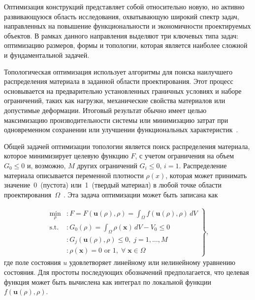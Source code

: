 Оптимизация конструкций представляет собой относительно новую, но активно развивающуюся область исследования, охватывающую широкий спектр задач, направленных на повышение функциональности и экономичности проектируемых объектов. В рамках данного направления выделяют три ключевых типа задач: оптимизацию размеров, формы и топологии, которая является наиболее сложной и фундаментальной задачей.


Топологическая оптимизация использует алгоритмы для поиска наилучшего распределения материала в заданной области проектирования. 
Этот процесс основывается на предварительно установленных граничных условиях и наборе ограничений, таких как нагрузки, механические свойства материалов или допустимые деформации. 
Итоговый результат обычно имеет целью максимизацию производительности системы или минимизацию затрат при одновременном сохранении или улучшении функциональных характеристик~\cite{Bendsoe2003}. 

Общей задачей оптимизации топологии является поиск распределения материала, которое минимизирует целевую функцию $F$, с учетом ограничения на объем $G_0 \leqslant 0$ и, возможно, $M$ других ограничений $G_i \leq 0$, $i=1$.
Распределение материала описывается переменной плотности $\rho(x)$, которая может принимать значение~0~(пустота) или~1~(твердый материал) в любой точке области проектирования~$\Omega$~\cite{Sigmund2013}. Эта задача оптимизации может быть записана как

\begin{equation}\label{eq:opt} 
	\begin{aligned}
	\left.
	\begin{array}{rl}
		\min\limits_{\rho} & : F = F(\mathbf{u}(\rho), \rho) = \int_{\Omega} f(\mathbf{u}(\rho), \rho) \, dV \\
		\text{s.t.} & : G_0(\rho) = \int_{\Omega} \rho(\mathbf{x}) \, dV - V_0 \leq 0 \\
		& : G_j(\mathbf{u}(\rho), \rho) \leq 0, \; j = 1, \ldots, M \\
		& : \rho(\mathbf{x}) = 0 \text{ or } 1, \; \forall \; \mathbf{x} \in \Omega
	\end{array} \right\},
	\end{aligned} 
\end{equation}
где поле состояния $u$ удовлетворяет линейному или нелинейному уравнению состояния.
Для простоты последующих обозначений предполагается, что целевая функция может быть вычислена как интеграл по локальной функции~$f(\mathbf{u}(\rho),\rho)$.

